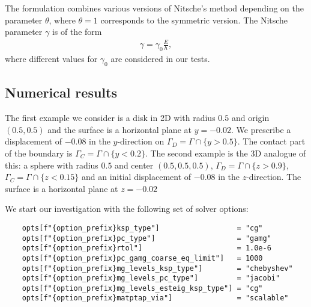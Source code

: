 \documentclass[12pt]{article}
\begin{document}
The formulation combines various versions of Nitsche's method depending on the parameter $\theta$, where $\theta = 1$ corresponds to the symmetric version.
The Nitsche parameter $\gamma$ is of the form 
\begin{align}
    \gamma = \gamma_0 \frac{E}{h},
\end{align}
where different values for $\gamma_0$ are considered in our tests.
\subsection{Numerical results}
The first example we consider is a disk in 2D with radius $0.5$ and origin $(0.5, 0.5)$ 
and the surface is a horizontal plane at $y = -0.02$. We prescribe a displacement of $-0.08$ in the $y$-direction
on $\Gamma_D = \Gamma \cap \{y > 0.5 \}$. The contact part of the boundary is 
$\Gamma_C  = \Gamma \cap \{y < 0.2 \}$. The second example is the 3D analogue of this: a sphere
with radius $0.5$ and center $(0.5, 0.5, 0.5)$, $\Gamma_D = \Gamma \cap \{z > 0.9\}$, $\Gamma_C = \Gamma \cap \{z< 0.15\}$ and an initial displacement of 
$-0.08$ in the $z$-direction. The surface is a horizontal plane at $z = -0.02$

We start our investigation with the following set of solver options:
\begin{verbatim}
    opts[f"{option_prefix}ksp_type"]                  = "cg"
    opts[f"{option_prefix}pc_type"]                   = "gamg"
    opts[f"{option_prefix}rtol"]                      = 1.0e-6
    opts[f"{option_prefix}pc_gamg_coarse_eq_limit"]   = 1000
    opts[f"{option_prefix}mg_levels_ksp_type"]        = "chebyshev"
    opts[f"{option_prefix}mg_levels_pc_type"]         = "jacobi"
    opts[f"{option_prefix}mg_levels_esteig_ksp_type"] = "cg"
    opts[f"{option_prefix}matptap_via"]               = "scalable"
\end{verbatim}
\end{document}
